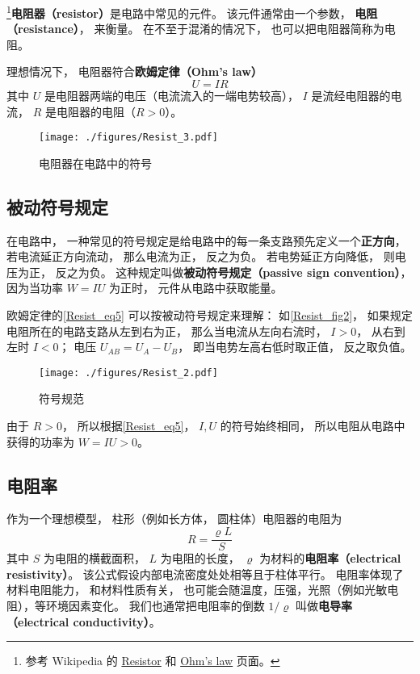 

\footnote{参考 Wikipedia 的 \href{https://en.wikipedia.org/wiki/Resistor}{Resistor} 和 \href{https://en.wikipedia.org/wiki/Ohm's_law}{Ohm's law} 页面。}\textbf{电阻器（resistor）}是电路中常见的元件。 该元件通常由一个参数， \textbf{电阻（resistance）}， 来衡量。 在不至于混淆的情况下， 也可以把电阻器简称为电阻。

理想情况下， 电阻器符合\textbf{欧姆定律（Ohm's law）}
\begin{equation}\label{Resist_eq5}
U = IR
\end{equation}
其中 $U$ 是电阻器两端的电压（电流流入的一端电势较高）， $I$ 是流经电阻器的电流， $R$ 是电阻器的电阻（$R > 0$）。

\begin{figure}[ht]
\centering
\texttt{[image: ./figures/Resist\_3.pdf]}
\caption{电阻器在电路中的符号} \label{Resist_fig3}
\end{figure}

\subsection{被动符号规定}\label{Resist_sub1}
在电路中， 一种常见的符号规定是给电路中的每一条支路预先定义一个\textbf{正方向}， 若电流延正方向流动， 那么电流为正， 反之为负。 若电势延正方向降低， 则电压为正， 反之为负。 这种规定叫做\textbf{被动符号规定（passive sign convention）}， 因为当功率 $W = IU$ 为正时， 元件从电路中获取能量。

欧姆定律的\autoref{Resist_eq5} 可以按被动符号规定来理解： 如\autoref{Resist_fig2}， 如果规定电阻所在的电路支路从左到右为正， 那么当电流从左向右流时， $I > 0$， 从右到左时 $I < 0$； 电压 $U_{AB} = U_A - U_B$， 即当电势左高右低时取正值， 反之取负值。

\begin{figure}[ht]
\centering
\texttt{[image: ./figures/Resist\_2.pdf]}
\caption{符号规范} \label{Resist_fig2}
\end{figure}

由于 $R > 0$， 所以根据\autoref{Resist_eq5}， $I, U$ 的符号始终相同， 所以电阻从电路中获得的功率为 $W = IU > 0$。

\subsection{电阻率}
作为一个理想模型， 柱形（例如长方体， 圆柱体）电阻器的电阻为
\begin{equation}
R = \frac{\varrho L}{S} 
\end{equation}
其中 $S$ 为电阻的横截面积， $L$ 为电阻的长度， $\varrho$ 为材料的\textbf{电阻率（electrical resistivity）}。 该公式假设内部电流密度处处相等且于柱体平行。 电阻率体现了材料电阻能力， 和材料性质有关， 也可能会随温度，压强，光照（例如光敏电阻），等环境因素变化。 我们也通常把电阻率的倒数 $1/\varrho$ 叫做\textbf{电导率（electrical conductivity）}。

